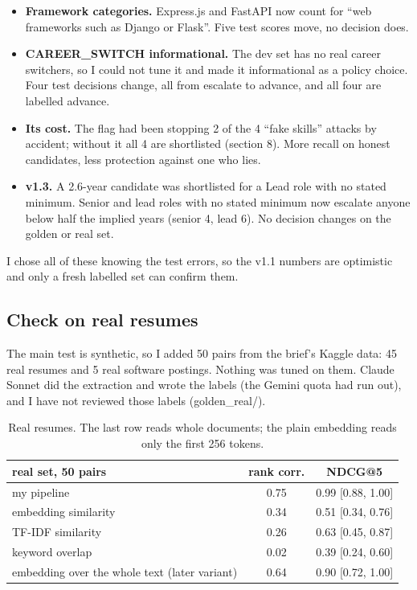\documentclass[conference]{styles/acmsiggraph}
\newcommand{\code}[1]{\textsf{\small #1}}
\begin{document}
\begin{itemize}
\item \textbf{Framework categories.} Express.js and FastAPI now count for ``web frameworks such as Django or Flask''. Five test scores move, no decision does.
\item \textbf{\code{CAREER\_SWITCH} informational.} The dev set has no real career switchers, so I could not tune it and made it informational as a policy choice. Four test decisions change, all from escalate to advance, and all four are labelled advance.
\item \textbf{Its cost.} The flag had been stopping 2 of the 4 ``fake skills'' attacks by accident; without it all 4 are shortlisted (section 8). More recall on honest candidates, less protection against one who lies.
\item \textbf{v1.3.} A 2.6-year candidate was shortlisted for a Lead role with no stated minimum. Senior and lead roles with no stated minimum now escalate anyone below half the implied years (senior 4, lead 6). No decision changes on the golden or real set.
\end{itemize}
I chose all of these knowing the test errors, so the v1.1 numbers are optimistic and only a fresh labelled set can confirm them.



\subsection{Check on real resumes}

The main test is synthetic, so I added 50 pairs from the brief's Kaggle data: 45 real resumes and 5 real software postings. Nothing was tuned on them. Claude Sonnet did the extraction and wrote the labels (the Gemini quota had run out), and I have not reviewed those labels (\code{golden\_real/}).

\begin{table}[t]
\centering\small
\begin{tabular}{lcc}
\toprule
real set, 50 pairs & rank corr. & NDCG@5 \\
\midrule
my pipeline & 0.75 & 0.99 [0.88, 1.00] \\
embedding similarity & 0.34 & 0.51 [0.34, 0.76] \\
TF-IDF similarity & 0.26 & 0.63 [0.45, 0.87] \\
keyword overlap & 0.02 & 0.39 [0.24, 0.60] \\
embedding over the whole text (later variant) & 0.64 & 0.90 [0.72, 1.00] \\
\bottomrule
\end{tabular}
\caption{Real resumes. The last row reads whole documents; the plain embedding reads only the first 256 tokens.}
\label{tab:real}
\end{table}
\end{document}
